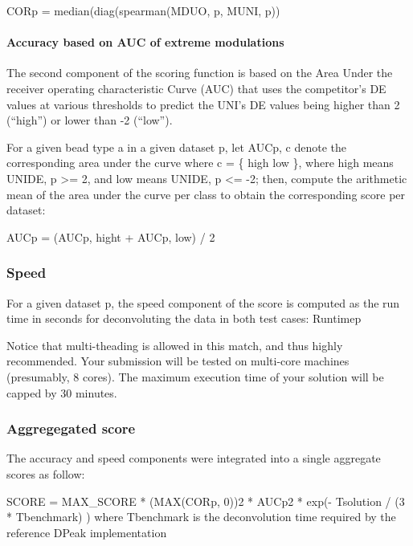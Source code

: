 \documentclass[]{article}
\let\oldparagraph\paragraph
\renewcommand{\paragraph}[1]{\oldparagraph{#1}\mbox{}}
\begin{document}
CORp = median(diag(spearman(MDUO, p, MUNI, p))

\hypertarget{accuracy-based-on-auc-of-extreme-modulations}{%
\paragraph{Accuracy based on AUC of extreme
modulations}\label{accuracy-based-on-auc-of-extreme-modulations}}

The second component of the scoring function is based on the Area Under
the receiver operating characteristic Curve (AUC) that uses the
competitor's DE values at various thresholds to predict the UNI's DE
values being higher than 2 (``high'') or lower than -2 (``low'').

For a given bead type a in a given dataset p, let AUCp, c denote the
corresponding area under the curve where c = \{ high \textbar{} low \},
where high means UNIDE, p \textgreater{}= 2, and low means UNIDE, p
\textless{}= -2; then, compute the arithmetic mean of the area under the
curve per class to obtain the corresponding score per dataset:

AUCp = (AUCp, hight + AUCp, low) / 2

\hypertarget{speed}{%
\subsubsection{Speed}\label{speed}}

For a given dataset p, the speed component of the score is computed as
the run time in seconds for deconvoluting the data in both test cases:
Runtimep

Notice that multi-theading is allowed in this match, and thus highly
recommended. Your submission will be tested on multi-core machines
(presumably, 8 cores). The maximum execution time of your solution will
be capped by 30 minutes.

\hypertarget{aggregegated-score}{%
\subsubsection{Aggregegated score}\label{aggregegated-score}}

The accuracy and speed components were integrated into a single
aggregate scores as follow:

SCORE = MAX\_SCORE * (MAX(CORp, 0))2 * AUCp2 * exp(- Tsolution / (3 *
Tbenchmark) ) where Tbenchmark is the deconvolution time required by the
reference DPeak implementation
\end{document}

